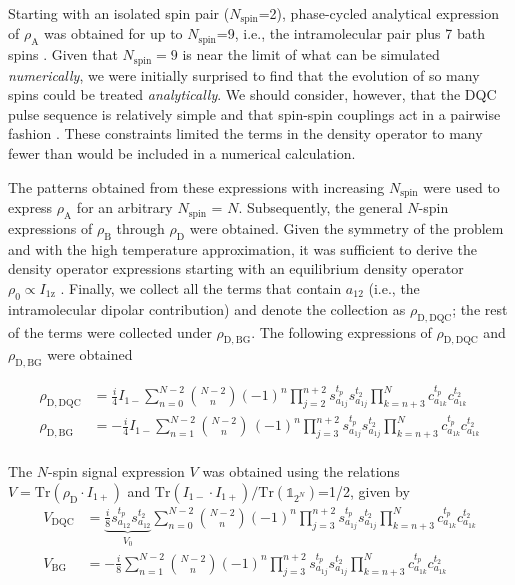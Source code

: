Starting with an isolated spin pair ($N_{\mathrm{spin}}$=2), phase-cycled analytical expression of $\rho_\mathrm{A}$ was obtained for up to $N_{\mathrm{spin}}$=9, i.e., the intramolecular pair plus 7 bath spins \cite{SinhaRoy2024apr}. Given that $N_{\mathrm{spin}} = 9$ is near the limit of what can be simulated \emph{numerically}, we were initially surprised to find that the evolution of so many spins could be treated \emph{analytically}. We should consider, however, that the DQC pulse sequence is relatively simple and that spin-spin couplings act in a pairwise fashion \cite{SinhaRoy2024apr}. These constraints limited the terms in the density operator to many fewer than would be included in a numerical calculation. 

The patterns obtained from these expressions with increasing $N_{\mathrm{spin}}$ were used to express $\rho_\mathrm{A}$ for an arbitrary $N_{\mathrm{spin}}$ = $N$. Subsequently, the general $N$-spin expressions of $\rho_\mathrm{B}$ through $\rho_\mathrm{D}$ were obtained. Given the symmetry of the problem and with the high temperature approximation, it was sufficient to derive the density operator expressions starting with an equilibrium density operator $\rho_0 \propto I_\mathrm{1z}$ \cite{Slichter1990}. Finally, we collect all the terms that contain $a_{12}$ (i.e., the intramolecular dipolar contribution) and denote the collection as $\rho_\mathrm{D,DQC}$; the rest of the terms were collected under $\rho_\mathrm{D,BG}$. The following expressions of $\rho_\mathrm{D,DQC}$ and $\rho_\mathrm{D,BG}$ were obtained \cite{SinhaRoy2024apr} 

\begin{equation}
    \begin{split}
        \rho_\mathrm{D,DQC} &= \frac{i}{4}I_\mathrm{1-}\sum_{n=0}^{N-2}\binom{N-2}{n}(-1)^{n}\prod_{j=2}^{n+2}s_{a_{1j}}^{t_p}s_{a_{1j}}^{t_2}\prod_{k=n+3}^{N}c_{a_{1k}}^{t_p}c_{a_{1k}}^{t_2} \\
        \rho_\mathrm{D,BG} &= -\frac{i}{4}I_\mathrm{1-}\sum_{n=1}^{N-2}\binom{N-2}{n}\,(-1)^{n}\prod_{j=3}^{n+2}s_{a_{1j}}^{t_p}s_{a_{1j}}^{t_2}\prod_{k=n+3}^{N}c_{a_{1k}}^{t_p}c_{a_{1k}}^{t_2} \\
    \end{split}
    \label{eqn:eq-rhoD}
\end{equation}

The $N$-spin signal expression $V$ was obtained using the relations $V = \mathrm{Tr}(\rho_\mathrm{D}\cdot I_{1+})$ and $\mathrm{Tr}(I_{1-}\cdot I_{1+})/\mathrm{Tr}(\mathbb{1}_{2^N})$=1/2, given by \cite{SinhaRoy2024apr}
\begin{equation}
    \begin{split}
        V_\mathrm{DQC} &= \underbrace{\frac{i}{8}s_{a_{12}}^{t_p}s_{a_{12}}^{t_2}}_{V_0}\sum_{n=0}^{N-2}\binom{N-2}{n}(-1)^{n}\prod_{j=3}^{n+2}s_{a_{1j}}^{t_p}s_{a_{1j}}^{t_2}\prod_{k=n+3}^{N}c_{a_{1k}}^{t_p}c_{a_{1k}}^{t_2} \\
        V_\mathrm{BG} &= -\frac{i}{8}\sum_{n=1}^{N-2}\binom{N-2}{n}(-1)^{n}\prod_{j=3}^{n+2}s_{a_{1j}}^{t_p}s_{a_{1j}}^{t_2}\prod_{k=n+3}^{N}c_{a_{1k}}^{t_p}c_{a_{1k}}^{t_2}    
    \end{split}
    \label{eqn:eq-dqcNspin}
\end{equation}

